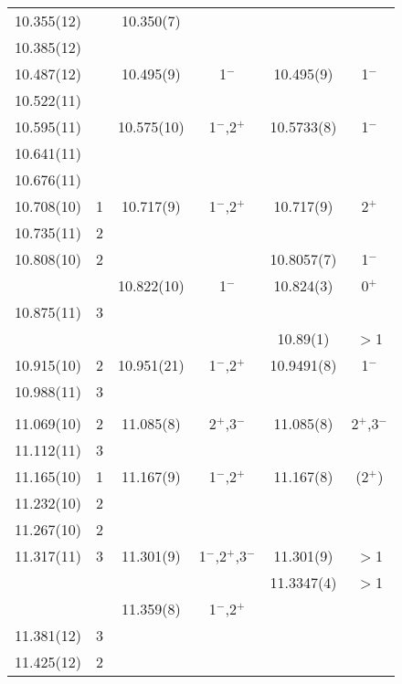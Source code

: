 \begin{center}
\begin{longtable}{cc cc cc}
  10.355(12)    &   &  10.350(7)  &   &   &   \\
  10.385(12)    &   &   &   &   &   \\
  10.487(12)    &   &  10.495(9)  & 1$^-$               & 10.495(9)   &  1$^-$          \\
  10.522(11)    &   &   &   &   &   \\
  10.595(11)    &   &  10.575(10) & 1$^-$,2$^+$         & 10.5733(8)  &  1$^-$          \\
     10.641(11)   &   &   &   &   &   \\
     10.676(11)   &   &   &   &   &   \\
     10.708(10)   & 1 &  10.717(9)  & 1$^-$,2$^+$         & 10.717(9)   &  2$^+$          \\
     10.735(11)   & 2 &   &   &   &   \\
     10.808(10)   & 2 &             &                     & 10.8057(7)  &  1$^-$          \\
  &   &  10.822(10) &   1$^-$             & 10.824(3)   &  0$^+$          \\
     10.875(11)   & 3 &   &   &   &   \\
  &   &             &                     & 10.89(1)    &  $>$1           \\
     10.915(10)   & 2 &  10.951(21) &  1$^-$,2$^+$        & 10.9491(8)  &  1$^-$          \\
   10.988(11)     & 3 &   &   &   &   \\
  &   &   &   &   &   \\
    11.069(10)    & 2 &  11.085(8)  &  2$^+$,3$^-$        & 11.085(8)   &  2$^+$,3$^- $   \\
     11.112(11)   & 3 &   &   &   &   \\
    11.165(10)    & 1 &  11.167(9)  &  1$^-$,2$^+$        & 11.167(8)   &  (2$^+$)        \\
    11.232(10)    & 2 &   &   &   &   \\
    11.267(10)    & 2 &   &   &   &   \\
    11.317(11)    & 3 &  11.301(9)  &  1$^-$,2$^+$,3$^-$  & 11.301(9)   &  $>$1           \\
  &   &             &                     & 11.3347(4)  &  $>$1           \\
  &   &  11.359(8)  &  1$^-$,2$^+$        &             &                 \\
    11.381(12)    & 3 &   &   &   &   \\
    11.425(12)    & 2 &   &   &   &   \\

\end{longtable}
\end{center}
